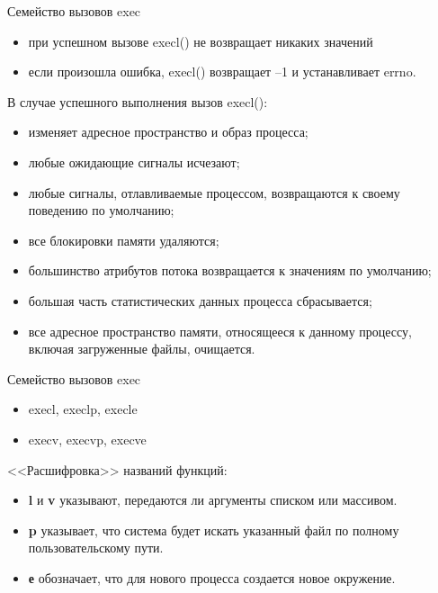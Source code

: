 \documentclass{beamer}
\begin{document}
\begin{frame}{Семейство вызовов exec}
\begin{itemize}
\item при успешном вызове execl() не возвращает никаких значений 
\item если произошла ошибка, execl() возвращает –1 и устанавливает errno.
\end{itemize}
В случае успешного выполнения вызов execl():
\begin{itemize}
\item изменяет адресное пространство и образ процесса;
\item любые ожидающие сигналы исчезают;
\item любые сигналы, отлавливаемые процессом, возвращаются к своему
поведению по умолчанию;
\item все блокировки памяти удаляются;
\item большинство атрибутов потока возвращается к значениям по умолчанию;
\item большая часть статистических данных процесса сбрасывается;
\item все адресное пространство памяти, относящееся к данному процессу, включая
загруженные файлы, очищается.
\end{itemize}
\end{frame}

\begin{frame}{Семейство вызовов exec}
\begin{itemize}
\item execl, execlp, execle  
\item execv, execvp, execve
\end{itemize}
<<Расшифровка>> названий функций:
\begin{itemize}
\item \textbf{l} и \textbf{v} указывают, передаются ли аргументы списком или массивом. 
\item \textbf{p} указывает, что система будет искать указанный файл по
полному пользовательскому пути. 
\item \textbf{е} обозначает, что для нового процесса создается новое окружение.
\end{itemize}
\end{frame}
\end{document}
